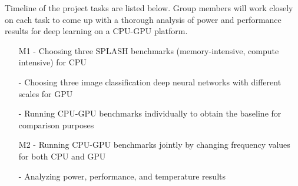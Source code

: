 Timeline of the project tasks are listed below. Group members will work closely on each task to come up with a thorough analysis of power and performance results for deep learning on a CPU-GPU platform. 

\begin{itemize}
\item[M1 -] Choosing three SPLASH benchmarks (memory-intensive, compute intensive) for CPU
\item[-] Choosing three image classification deep neural networks with different scales for GPU
\item[-] Running CPU-GPU benchmarks individually to obtain the baseline for comparison purposes
\item[M2 -] Running CPU-GPU benchmarks jointly by changing frequency values for both CPU and GPU
\item[-] Analyzing power, performance, and temperature results 
\end{itemize}